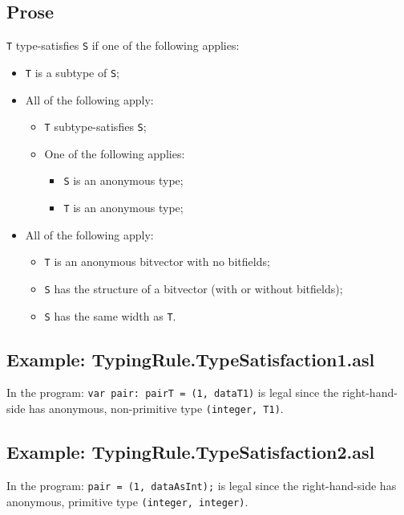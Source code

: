 \documentclass{book}
\begin{document}
\subsection{Prose}

\texttt{T} type-satisfies \texttt{S} if one of the following applies:
 \begin{itemize}
 \item \texttt{T} is a subtype of \texttt{S};
 \item All of the following apply:
    \begin{itemize}
    \item \texttt{T} subtype-satisfies \texttt{S};
    \item One of the following applies:
      \begin{itemize}
      \item \texttt{S} is an anonymous type;
      \item \texttt{T} is an anonymous type;
      \end{itemize}
    \end{itemize}
  \item All of the following apply:
    \begin{itemize}
    \item \texttt{T} is an anonymous bitvector with no bitfields;
    \item \texttt{S} has the structure of a bitvector (with or without bitfields);
    \item \texttt{S} has the same width as \texttt{T}.
    \end{itemize}
  \end{itemize}

\subsection{Example: TypingRule.TypeSatisfaction1.asl}
    In the program:
    \texttt{var pair: pairT = (1, dataT1)} is legal since the right-hand-side has
    anonymous, non-primitive type \texttt{(integer, T1)}.

\subsection{Example: TypingRule.TypeSatisfaction2.asl}
    In the program:
    \texttt{pair = (1, dataAsInt);} is legal since the right-hand-side has anonymous,
    primitive type \texttt{(integer, integer)}.
\end{document}
